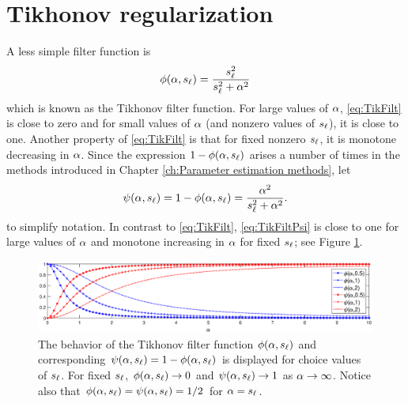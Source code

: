 \section{Tikhonov regularization} \label{sec:Tikhonov reg.}

A less simple filter function is
\begin{equation}
\phi(\alpha,s_\ell)  = \frac{s_\ell^2}{s_\ell^2 + \alpha^2}
\label{eq:TikFilt}
\end{equation}
which is known as the Tikhonov filter function. For large values of $\alpha$, \eqref{eq:TikFilt} is close to zero and for small values of $\alpha$ (and nonzero values of $s_\ell$), it is close to one. Another property of \eqref{eq:TikFilt} is that for fixed nonzero $s_\ell$, it is monotone decreasing in $\alpha$. Since the expression $1 - \phi(\alpha,s_\ell)$ arises a number of times in the methods introduced in Chapter \ref{ch:Parameter estimation methods}, let
\begin{equation}
\psi(\alpha,s_\ell) = 1 - \phi(\alpha,s_\ell) = \frac{\alpha^2}{s_\ell^2 + \alpha^2}.
\label{eq:TikFiltPsi}
\end{equation}
to simplify notation. In contrast to \eqref{eq:TikFilt}, \eqref{eq:TikFiltPsi} is close to one for large values of $\alpha$ and monotone increasing in $\alpha$ for fixed $s_\ell$; see Figure \ref{fig:Phi Psi Plot}. \par 

\begin{figure}
	\centerline{\includegraphics[scale = 0.4]{Figures/Phi_Psi_Plot.eps}}
\caption{The behavior of the Tikhonov filter function $\phi(\alpha,s_\ell)$ and corresponding $\psi(\alpha,s_\ell) = 1 - \phi(\alpha,s_\ell)$ is displayed for choice values of $s_\ell$. For fixed $s_\ell$, $\phi(\alpha,s_\ell) \rightarrow 0$ and $\psi(\alpha,s_\ell) \rightarrow 1$ as $\alpha \rightarrow \infty$. Notice also that $\phi(\alpha,s_\ell) = \psi(\alpha,s_\ell) = 1/2$ for $\alpha = s_\ell$.}
\label{fig:Phi Psi Plot}
\end{figure}

